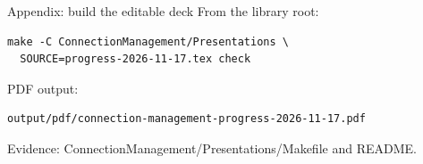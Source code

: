 \documentclass[11pt,aspectratio=169]{beamer}
\newcommand{\evidence}[1]{\vfill{\fontsize{7}{8}\selectfont\color{Muted}Evidence: #1\par}}
\begin{document}
\begin{frame}[fragile]{Appendix: build the editable deck}
\small
From the library root:
\begin{lstlisting}
make -C ConnectionManagement/Presentations \
  SOURCE=progress-2026-11-17.tex check
\end{lstlisting}
PDF output:
\begin{lstlisting}
output/pdf/connection-management-progress-2026-11-17.pdf
\end{lstlisting}
\evidence{ConnectionManagement/Presentations/Makefile and README.}
\end{frame}
\end{document}
